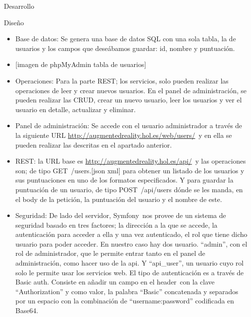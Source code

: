 Desarrollo

Diseño

\begin{itemize}
\itemsep1pt\parskip0pt
\item
  Base de datos: Se genera una base de datos SQL con una sola tabla, la
  de usuarios y los campos que deseábamos guardar: id, nombre y
  puntuación.
\item
  {[}imagen de phpMyAdmin tabla de usuarios{]}
\item
  Operaciones: Para la parte REST; los servicios, solo pueden realizar
  las operaciones de leer y crear nuevos usuarios. En el panel de
  administración, se pueden realizar las CRUD, crear un nuevo usuario,
  leer los usuarios y ver el usuario en detalle, actualizar y eliminar.
\item
  Panel de administración: Se accede con el usuario administrador a
  través de la siguiente URL
  \href{https://www.google.com/url?q=http://augmentedreality.hol.es/web/users/\&sa=D\&ust=1464634042361000\&usg=AFQjCNFwQ4SJk4Ygawz6Jrw4gptT3InHkA}{http://augmentedreality.hol.es/web/users/}~y
  en ella se pueden realizar las descritas en el apartado anterior.
\item
  REST: la URL base es
  \href{https://www.google.com/url?q=http://augmentedreality.hol.es/api/\&sa=D\&ust=1464634042362000\&usg=AFQjCNEf7jvsZruymzVfFypQzxAwzfAuuw}{http://augmentedreality.hol.es/api/}~y
  las operaciones son; de tipo GET~/users.{[}json \textbar{} xml{]} para
  obtener un listado de los usuarios y sus puntuaciones en uno de los
  formatos especificados. Y para guardar la puntuación de un usuario, de
  tipo POST~/api/users dónde se les manda, en el body de la petición, la
  puntuación del usuario y el nombre de este.
\item
  Seguridad: De lado del servidor, Symfony~nos provee de un sistema de
  seguridad basado en tres factores; la dirección a la que se accede, la
  autenticación para acceder a ella y una vez autenticado, el rol que
  tiene dicho usuario para poder acceder. En nuestro caso hay dos
  usuario. ``admin'', con el rol de administrador, que le permite entrar
  tanto en el panel de administración, como hacer uso de la api. Y
  ``api\_user'', un usuario cuyo rol solo le permite usar los servicios
  web. El tipo de autenticación es a través de Basic auth. Consiste en
  añadir un campo en el header~con la clave ``Authorization'' y como
  valor, la palabra ``Basic'' concatenada y separados por un espacio con
  la combinación de ``username:password'' codificada en Base64.
\end{itemize}


